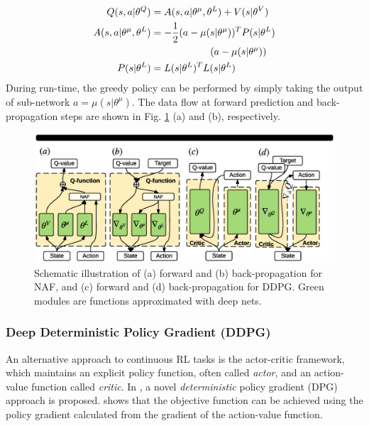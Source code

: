 \documentclass[../thesis.tex]{subfiles}
\begin{document}
\begin{align}
\centering
Q(s,a|\theta^Q) &= A(s,a | \theta^\mu, \theta^L) + V(s|\theta^V) \\
A(s,a | \theta^\mu, \theta^L) &= -\frac{1}{2}(a-\mu(s|\theta^\mu))^T P(s|\theta^L)\nonumber \\
&\qquad \qquad \qquad(a-\mu(s|\theta^\mu)) \label{equ:NAF} \\
P(s|\theta^L) &= L(s|\theta^L)^TL(s|\theta^L) \label{equ:P}
\end{align}
During run-time, the greedy policy can be performed by simply taking the output of sub-network $a = \mu(s|\theta^\mu)$. The data flow at forward prediction and back-propagation steps are shown in Fig. \ref{fig:CDQN-DDPG} (a) and (b), respectively.
 
\begin{figure}[t]
  \begin{center}
  \centerline{\includegraphics[width=0.8\columnwidth,trim= 80 900 110 70, clip=true]{./MultimodalDRL/fig/naf_ddpg}}
  \caption{Schematic illustration of (a) forward and (b) back-propagation for NAF, and (c) forward and (d) back-propagation for DDPG. Green modules are functions approximated with deep nets.}
  \label{fig:CDQN-DDPG}
  \end{center}
  \vskip -0.5in
\end{figure}
 
\subsubsection{Deep Deterministic Policy Gradient (DDPG)}
An alternative approach to continuous RL tasks is the actor-critic framework, which maintains an explicit policy function, often called \textit{actor}, and an action-value function called \textit{critic}.
In \cite{dpg}, a novel \emph{deterministic} policy gradient (DPG) approach is proposed. \citet{dpg} shows that the objective function can be achieved using the policy gradient calculated from the gradient of the action-value function.
 
\end{document}
